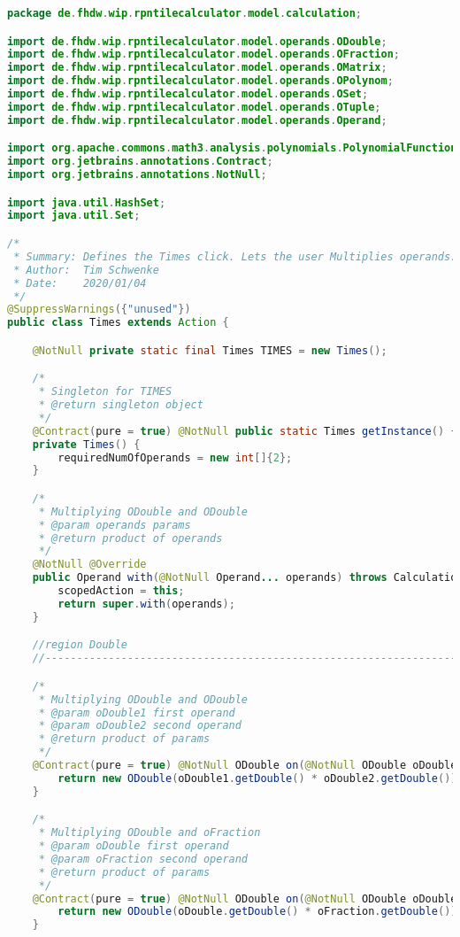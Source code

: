 \begin{lstlisting}[caption=Times (Schwenke),label=list:Times,language=Java]
package de.fhdw.wip.rpntilecalculator.model.calculation;

import de.fhdw.wip.rpntilecalculator.model.operands.ODouble;
import de.fhdw.wip.rpntilecalculator.model.operands.OFraction;
import de.fhdw.wip.rpntilecalculator.model.operands.OMatrix;
import de.fhdw.wip.rpntilecalculator.model.operands.OPolynom;
import de.fhdw.wip.rpntilecalculator.model.operands.OSet;
import de.fhdw.wip.rpntilecalculator.model.operands.OTuple;
import de.fhdw.wip.rpntilecalculator.model.operands.Operand;

import org.apache.commons.math3.analysis.polynomials.PolynomialFunction;
import org.jetbrains.annotations.Contract;
import org.jetbrains.annotations.NotNull;

import java.util.HashSet;
import java.util.Set;

/*
 * Summary: Defines the Times click. Lets the user Multiplies operands.
 * Author:  Tim Schwenke
 * Date:    2020/01/04
 */
@SuppressWarnings({"unused"})
public class Times extends Action {

    @NotNull private static final Times TIMES = new Times();

    /*
     * Singleton for TIMES
     * @return singleton object
     */
    @Contract(pure = true) @NotNull public static Times getInstance() { return TIMES; }
    private Times() {
        requiredNumOfOperands = new int[]{2};
    }

    /*
     * Multiplying ODouble and ODouble
     * @param operands params
     * @return product of operands
     */
    @NotNull @Override
    public Operand with(@NotNull Operand... operands) throws CalculationException {
        scopedAction = this;
        return super.with(operands);
    }

    //region Double
    //------------------------------------------------------------------------------------

    /*
     * Multiplying ODouble and ODouble
     * @param oDouble1 first operand
     * @param oDouble2 second operand
     * @return product of params
     */
    @Contract(pure = true) @NotNull ODouble on(@NotNull ODouble oDouble1, @NotNull ODouble oDouble2) {
        return new ODouble(oDouble1.getDouble() * oDouble2.getDouble());
    }

    /*
     * Multiplying ODouble and oFraction
     * @param oDouble first operand
     * @param oFraction second operand
     * @return product of params
     */
    @Contract(pure = true) @NotNull ODouble on(@NotNull ODouble oDouble, @NotNull OFraction oFraction) {
        return new ODouble(oDouble.getDouble() * oFraction.getDouble());
    }


\end{lstlisting}

